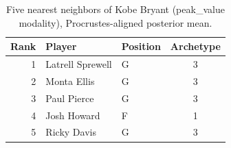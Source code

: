 \begin{table}[htbp]
  \centering\small
  \begin{tabular}{rllc}
    \toprule
    Rank & Player & Position & Archetype \\
    \midrule
    1 & Latrell Sprewell & G & 3 \\
    2 & Monta Ellis & G & 3 \\
    3 & Paul Pierce & G & 3 \\
    4 & Josh Howard & F & 1 \\
    5 & Ricky Davis & G & 3 \\
    \bottomrule
  \end{tabular}
  \caption{Five nearest neighbors of Kobe Bryant (peak_value modality), Procrustes-aligned posterior mean.}
  \label{tab:Kobe_Bryant_neighbors_peak_value}
\end{table}

